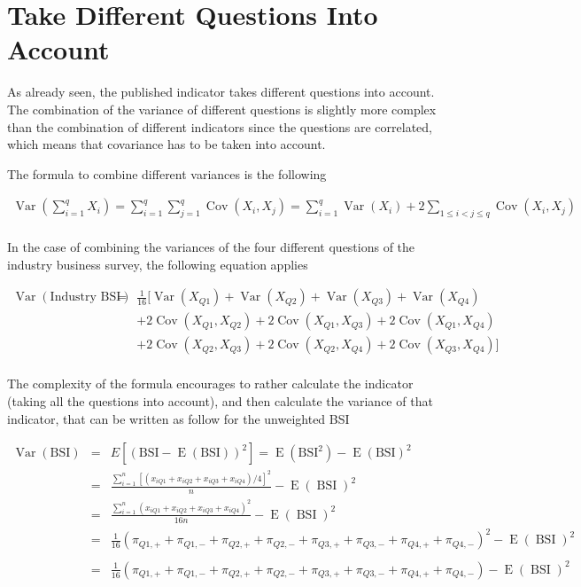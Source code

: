 \documentclass[12pt,a4paper,oneside]{book}
\DeclareMathOperator{\Var}{Var}
\DeclareMathOperator{\Cov}{Cov}
\DeclareMathOperator{\E}{E}
\DeclareMathOperator{\BSI}{BSI}
\begin{document}
\section{Take Different Questions Into Account}

As already seen, the published indicator takes different questions into account. 
The combination of the variance of different questions is slightly more complex than the combination of different indicators since the questions are correlated, which means that covariance has to be taken into account.

The formula to combine different variances is the following

\begin{eqnarray}
\Var \left(\sum_{i=1}^{q} X_{i}\right) = \sum_{i=1}^{q} \sum_{j=1}^{q} \Cov\left(X_{i}, X_{j}\right)
= \sum_{i=1}^{q} \Var\left(X_{i}\right)+2 \sum_{1 \leq i<j \leq q} \Cov\left(X_{i}, X_{j}\right) \label{eq:sum of variances} \\ \nonumber
\end{eqnarray} 

In the case of combining the variances of the four different questions of the industry business survey, the following equation applies

\begin{eqnarray}
    \Var \left( \text{Industry BSI} \right) 
    &=& \frac{1}{16} \Big[ \Var(X_{Q1}) + \Var(X_{Q2}) + \Var(X_{Q3}) + \Var(X_{Q4}) \nonumber \\
    && + 2 \Cov (X_{Q1},X_{Q2}) + 2 \Cov (X_{Q1},X_{Q3}) + 2 \Cov (X_{Q1},X_{Q4}) \nonumber \\
    &&  + 2 \Cov (X_{Q2},X_{Q3}) + 2 \Cov (X_{Q2},X_{Q4}) + 2 \Cov (X_{Q3},X_{Q4}) \Big] \nonumber \\
\end{eqnarray}

The complexity of the formula encourages to rather calculate the indicator (taking all the questions into account), and then calculate the variance of that indicator, that can be written as follow for the unweighted BSI

\begin{eqnarray}
         \Var(\text{BSI}) &=& E \left[ \left(\text{BSI}-\E(\text{BSI}) \right)^2 \right] =  \E \left( \text{BSI}^2\right) - \E \left( \text{BSI}\right)^2 \\ 
         &=&  \frac{\sum^n_{i=1}[(x_{iQ1} + x_{iQ2} + x_{iQ3} + x_{iQ4})/4]^2}{n} - \E (\BSI)^2 \\
        &=&  \frac{\sum^n_{i=1}(x_{iQ1} + x_{iQ2} + x_{iQ3} + x_{iQ4})^2}{16n} - \E (\BSI)^2 \\
        &=& \frac{1}{16} \left( \pi_{Q1,+} + \pi_{Q1,-} + \pi_{Q2,+} + \pi_{Q2,-} + \pi_{Q3,+} + \pi_{Q3,-} + \pi_{Q4,+} + \pi_{Q4,-} \right)^2 - \E (\BSI)^2
        \nonumber \\  \\
        &=& \frac{1}{16} \left( \pi_{Q1,+} + \pi_{Q1,-} + \pi_{Q2,+} + \pi_{Q2,-} + \pi_{Q3,+} + \pi_{Q3,-} + \pi_{Q4,+} + \pi_{Q4,-} \right) - \E (\BSI)^2 \nonumber \\ 
\end{eqnarray}
\end{document}
